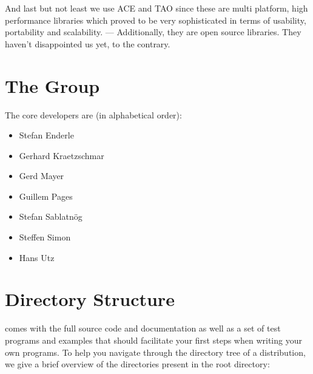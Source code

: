 \documentclass[10pt]{book}
\begin{document}

And last but not least we use ACE and TAO since these are multi
platform, high performance libraries which proved to be very
sophisticated in terms of usability, portability and scalability. ---
Additionally, they are open source libraries. They haven't
disappointed us yet, to the contrary.

\section{The \miro Group}

The \miro core developers are (in alphabetical order):
\begin{itemize}
  \item Stefan Enderle
  \item Gerhard Kraetzschmar
  \item Gerd Mayer
  \item Guillem Pages
  \item Stefan Sablatn\"og
  \item Steffen Simon
  \item Hans Utz
\end{itemize}

\section{\miro Directory Structure}

\miro comes with the full source code and documentation as well as a
set of test programs and examples that should facilitate your first
steps when writing your own programs. To help you navigate through the
directory tree of a \miro distribution, we give a brief overview of
the directories present in the \miro root directory:
\end{document}

